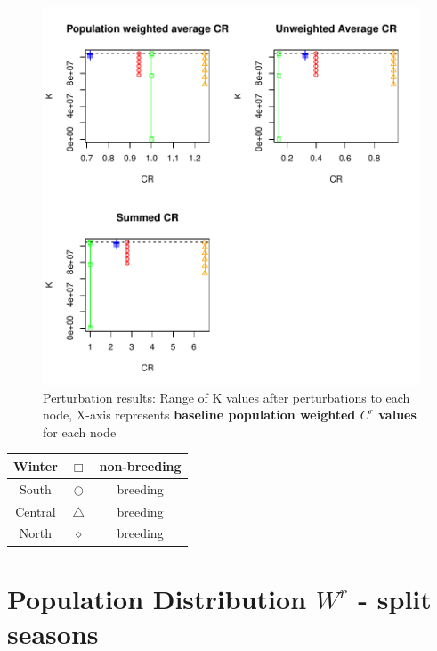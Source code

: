 \documentclass[10pt]{article}
\begin{document}
\vspace{-.5cm}
\begin{figure}[H]
\begin{center}
\includegraphics[width=\textwidth, height=.8\textwidth]{RGraphics-monarch_barcr_averageCR}
\caption{Perturbation results: Range of K values after perturbations to each node, X-axis represents {\bf{baseline population weighted $C^r$ values}} for each node}\label{fig:monarch_barcr_averageCR}
\end{center}
\end{figure}

\vspace{-.5cm}
\begin{tabular}{|c|c|c|}
\hline
{\color{green}Winter} & $\Box$ & non-breeding \\
\hline
{\color{red}South} & $\bigcirc$ & breeding \\
\hline
{\color{orange}Central} & $\triangle$ & breeding \\
\hline
{\color{blue}North} & $\diamond$ & breeding \\
\hline
\end{tabular}







\newpage
\section{Population Distribution \texorpdfstring{$W^r$}{WR} - split seasons}
\end{document}
